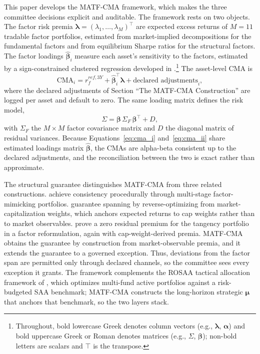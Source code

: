 \documentclass[pdftex,12pt,a4paper]{article}
\begin{document}
This paper develops the MATF-CMA framework, which makes the three committee decisions explicit and auditable. The framework rests on two objects. The factor risk premia $\boldsymbol\lambda = (\lambda_1, \ldots, \lambda_M)^{\intercal}$ are expected excess returns of $M=11$ tradable factor portfolios, estimated from market-implied decompositions for the fundamental factors and from equilibrium Sharpe ratios for the structural factors. The factor loadings $\hat{\boldsymbol\beta}_i$ measure each asset's sensitivity to the factors, estimated by a sign-constrained clustered regression developed in \citep{SeppFactorLassoCSDA2026}.\footnote{Throughout, bold lowercase Greek denotes column vectors (e.g., $\boldsymbol\lambda$, $\boldsymbol\alpha$) and bold uppercase Greek or Roman denotes matrices (e.g., $\Sigma$, $\boldsymbol\beta$); non-bold letters are scalars and $\intercal$ is the transpose.} The asset-level CMA is
\begin{equation}\label{eq:cma_i}
	\text{CMA}_i = r_f^{ref,3Y} + \hat{\boldsymbol\beta}_i^{\intercal} \boldsymbol\lambda + \text{declared adjustments}_i,
\end{equation}
where the declared adjustments of Section ``The MATF-CMA Construction'' are logged per asset and default to zero. The same loading matrix defines the risk model,
\begin{equation}\label{eq:cma_ii}
	\Sigma = \boldsymbol\beta\, \Sigma_F\, \boldsymbol\beta^{\intercal} + D,
\end{equation}
with $\Sigma_F$ the $M \times M$ factor covariance matrix and $D$ the diagonal matrix of residual variances. Because Equations~\eqref{eq:cma_i} and~\eqref{eq:cma_ii} share estimated loadings matrix $\hat{\boldsymbol\beta}$, the CMAs are alpha-beta consistent up to the declared adjustments, and the reconciliation between the two is exact rather than approximate.

The structural guarantee distinguishes MATF-CMA from three related constructions. \cite{CeriaStubbsAlpha2013} achieve consistency procedurally through multi-stage factor-mimicking portfolios. \cite{BlackLitterman1992} guarantee spanning by reverse-optimizing from market-capitalization weights, which anchors expected returns to cap weights rather than to market observables. \cite{RoncalliXu2024} prove a zero residual premium for the tangency portfolio in a factor reformulation, again with cap-weight-derived premia. MATF-CMA obtains the guarantee by construction from market-observable premia, and it extends the guarantee to a governed exception. Thus, deviations from the factor span are permitted only through declared channels, so the committee sees every exception it grants. The framework complements the ROSAA tactical allocation framework of \citet{Rosaa2026}, which optimizes multi-fund active portfolios against a risk-budgeted SAA benchmark; MATF-CMA constructs the long-horizon strategic $\boldsymbol\mu$ that anchors that benchmark, so the two layers stack.
\end{document}
